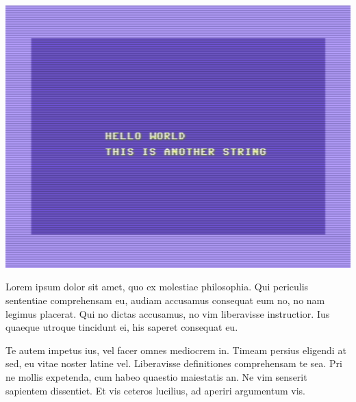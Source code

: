 \begin{minipage}{0.6\textwidth}
\includegraphics{images/c64/01_helloworld.png}
\end{minipage}
\begin{minipage}{0.4\textwidth}
Lorem ipsum dolor sit amet, quo ex molestiae philosophia. Qui periculis sententiae comprehensam eu, audiam accusamus consequat eum no, no nam legimus placerat. Qui no dictas accusamus, no vim liberavisse instructior. Ius quaeque utroque tincidunt ei, his saperet consequat eu.
\end{minipage}
Te autem impetus ius, vel facer omnes mediocrem in. Timeam persius eligendi at sed, eu vitae noster latine vel. Liberavisse definitiones comprehensam te sea. Pri ne mollis expetenda, cum habeo quaestio maiestatis an. Ne vim senserit sapientem dissentiet. Et vis ceteros lucilius, ad aperiri argumentum vis.


